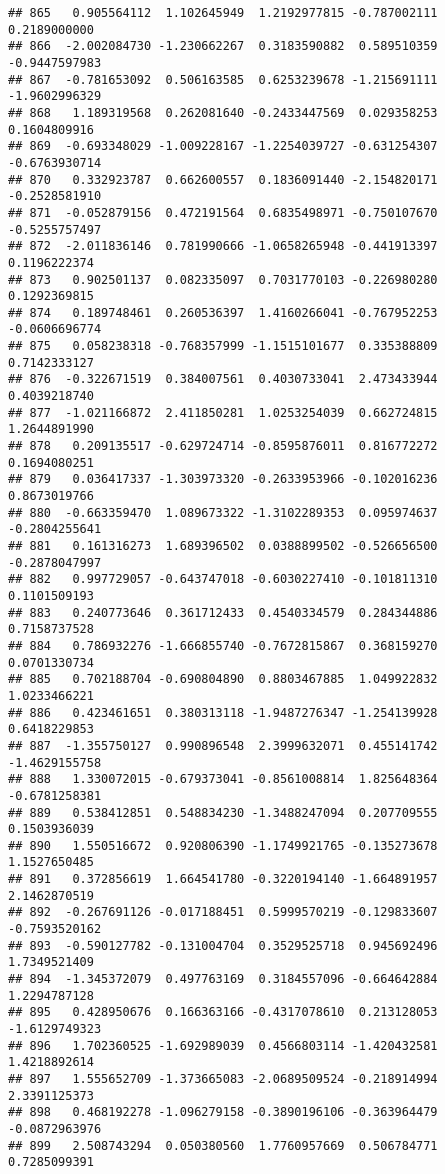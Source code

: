 \documentclass[
]{article}
\begin{document}
\begin{verbatim}
## 865   0.905564112  1.102645949  1.2192977815 -0.787002111  0.2189000000
## 866  -2.002084730 -1.230662267  0.3183590882  0.589510359 -0.9447597983
## 867  -0.781653092  0.506163585  0.6253239678 -1.215691111 -1.9602996329
## 868   1.189319568  0.262081640 -0.2433447569  0.029358253  0.1604809916
## 869  -0.693348029 -1.009228167 -1.2254039727 -0.631254307 -0.6763930714
## 870   0.332923787  0.662600557  0.1836091440 -2.154820171 -0.2528581910
## 871  -0.052879156  0.472191564  0.6835498971 -0.750107670 -0.5255757497
## 872  -2.011836146  0.781990666 -1.0658265948 -0.441913397  0.1196222374
## 873   0.902501137  0.082335097  0.7031770103 -0.226980280  0.1292369815
## 874   0.189748461  0.260536397  1.4160266041 -0.767952253 -0.0606696774
## 875   0.058238318 -0.768357999 -1.1515101677  0.335388809  0.7142333127
## 876  -0.322671519  0.384007561  0.4030733041  2.473433944  0.4039218740
## 877  -1.021166872  2.411850281  1.0253254039  0.662724815  1.2644891990
## 878   0.209135517 -0.629724714 -0.8595876011  0.816772272  0.1694080251
## 879   0.036417337 -1.303973320 -0.2633953966 -0.102016236  0.8673019766
## 880  -0.663359470  1.089673322 -1.3102289353  0.095974637 -0.2804255641
## 881   0.161316273  1.689396502  0.0388899502 -0.526656500 -0.2878047997
## 882   0.997729057 -0.643747018 -0.6030227410 -0.101811310  0.1101509193
## 883   0.240773646  0.361712433  0.4540334579  0.284344886  0.7158737528
## 884   0.786932276 -1.666855740 -0.7672815867  0.368159270  0.0701330734
## 885   0.702188704 -0.690804890  0.8803467885  1.049922832  1.0233466221
## 886   0.423461651  0.380313118 -1.9487276347 -1.254139928  0.6418229853
## 887  -1.355750127  0.990896548  2.3999632071  0.455141742 -1.4629155758
## 888   1.330072015 -0.679373041 -0.8561008814  1.825648364 -0.6781258381
## 889   0.538412851  0.548834230 -1.3488247094  0.207709555  0.1503936039
## 890   1.550516672  0.920806390 -1.1749921765 -0.135273678  1.1527650485
## 891   0.372856619  1.664541780 -0.3220194140 -1.664891957  2.1462870519
## 892  -0.267691126 -0.017188451  0.5999570219 -0.129833607 -0.7593520162
## 893  -0.590127782 -0.131004704  0.3529525718  0.945692496  1.7349521409
## 894  -1.345372079  0.497763169  0.3184557096 -0.664642884  1.2294787128
## 895   0.428950676  0.166363166 -0.4317078610  0.213128053 -1.6129749323
## 896   1.702360525 -1.692989039  0.4566803114 -1.420432581  1.4218892614
## 897   1.555652709 -1.373665083 -2.0689509524 -0.218914994  2.3391125373
## 898   0.468192278 -1.096279158 -0.3890196106 -0.363964479 -0.0872963976
## 899   2.508743294  0.050380560  1.7760957669  0.506784771  0.7285099391

\end{verbatim}
\end{document}
